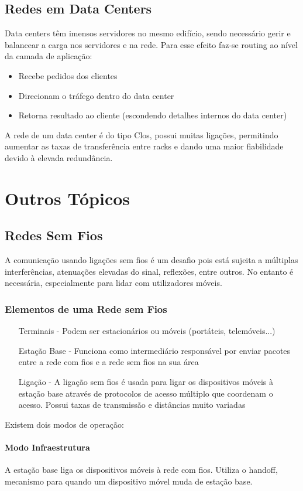 \documentclass[10pt,a4paper]{report}
\begin{document}
\section{Redes em Data Centers}
Data centers têm imensos servidores no mesmo edifício, sendo necessário gerir e balancear a carga nos servidores e na rede. Para esse efeito faz-se routing ao nível da camada de aplicação:
\begin{itemize}
\item Recebe pedidos dos clientes
\item Direcionam o tráfego dentro do data center
\item Retorna resultado ao cliente (escondendo detalhes internos do data center)
\end{itemize}
A rede de um data center é do tipo Clos, possui muitas ligações, permitindo aumentar as taxas de transferência entre racks e dando uma maior fiabilidade devido à elevada redundância.

\chapter{Outros Tópicos}
\minitoc
\section{Redes Sem Fios}
A comunicação usando ligações sem fios é um desafio pois está sujeita a múltiplas interferências, atenuações elevadas do sinal, reflexões, entre outros. No entanto é necessária, especialmente para lidar com utilizadores móveis.
\subsection{Elementos de uma Rede sem Fios}
\begin{itemize}
\item[Terminais] - Podem ser estacionários ou móveis (portáteis, telemóveis...)
\item[Estação Base] - Funciona como intermediário responsável por enviar pacotes entre a rede com fios e a rede sem fios na sua área
\item[Ligação] - A ligação sem fios é usada para ligar os dispositivos móveis à estação base através de protocolos de acesso múltiplo que coordenam o acesso. Possui taxas de transmissão e distâncias muito variadas
\end{itemize}
Existem dois modos de operação:
\subsubsection{Modo Infraestrutura}
A estação base liga os dispositivos móveis à rede com fios. Utiliza o handoff, mecanismo para quando um dispositivo móvel muda de estação base.
\end{document}
